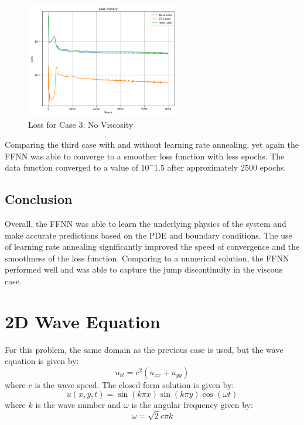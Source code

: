 \documentclass[11pt]{article}
\begin{document}
\begin{figure}[h]
    \centering
    \includegraphics[width=0.6\textwidth]{1D_Loss_NU3_Annealing.png}
    \caption{Loss for Case 3: No Viscosity}
    \label{fig:Loss_NU3_LR}
\end{figure}

Comparing the third case with and without learning rate annealing, yet again the FFNN was able to converge to a smoother loss function with less epochs. The data function converged to a value of $10^-1.5$ after approximately 2500 epochs.

\subsection{Conclusion}

Overall, the FFNN was able to learn the underlying physics of the system and make accurate predictions based on the PDE and boundary conditions. The use of learning rate annealing significantly improved the speed of convergence and the smoothness of the loss function. Comparing to a numerical solution, the FFNN performed well and was able to capture the jump discontinuity in the viscous case.

\pagebreak

\section{2D Wave Equation}
For this problem, the same domain as the previous case is used, but the wave equation is given by:
\begin{equation}
    u_{tt} = c^2 (u_{xx} + u_{yy})
\end{equation}
where $c$ is the wave speed. The closed form solution is given by:
\begin{equation}
    u(x, y, t) = \sin(k \pi x) \sin(k \pi y) \cos(\omega t) 
\end{equation}
where $k$ is the wave number and $\omega$ is the angular frequency given by:
\begin{equation}
    \omega = \sqrt{2} c \pi k
\end{equation}
\end{document}
